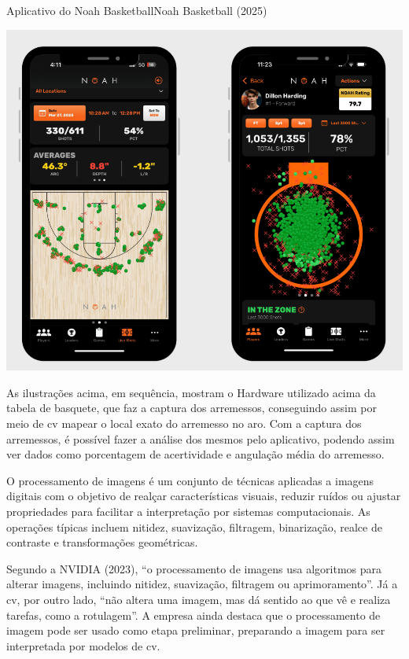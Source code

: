 \begin{figura}{Aplicativo do Noah Basketball}{Noah Basketball (2025)}
    \begin{flushleft}
        \label{fig:noah-app}
        \includegraphics[width=0.65\linewidth]{resources/floats/ilustracoes/noahapp.png}
    \end{flushleft}
\end{figura}
\FloatBarrier

As ilustrações acima, em sequência, mostram o Hardware utilizado acima da tabela de basquete, que faz a captura dos arremessos, conseguindo assim por meio de \ac{cv} mapear o local exato do arremesso no aro. Com a captura dos arremessos,
é possível fazer a análise dos mesmos pelo aplicativo, podendo assim ver dados como porcentagem de acertividade e angulação média do arremesso.



O processamento de imagens é um conjunto de técnicas aplicadas a imagens digitais com o objetivo de realçar características visuais, reduzir ruídos ou ajustar propriedades para facilitar a interpretação por sistemas computacionais. 
As operações típicas incluem nitidez, suavização, filtragem, binarização, realce de contraste e transformações geométricas.

Segundo a NVIDIA (2023), ``o processamento de imagens usa algoritmos para alterar imagens, incluindo nitidez, suavização, filtragem ou aprimoramento''. 
Já a \ac{cv}, por outro lado, ``não altera uma imagem, mas dá sentido ao que vê e realiza tarefas, como a rotulagem''. A empresa ainda destaca que o processamento de imagem pode ser usado como etapa preliminar, 
preparando a imagem para ser interpretada por modelos de \ac{cv}.

